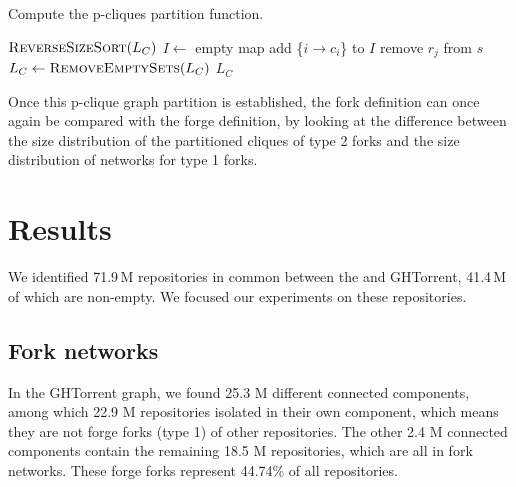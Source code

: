 \begin{algorithm}[t]
    \caption{Compute the p-cliques partition function.}%
    \label{algo:fork-clique-partition}
    \begin{algorithmic}
        \State $\Call{ReverseSizeSort}{L_C}$ 
        \State $I \gets$ empty map 
            \State add \{$i \rightarrow c_i$\} to $I$
        \EndFor
                    \vspace{-\baselineskip}
                        \State remove $r_j$ from $s$
                    \EndIf
                \EndFor
            \EndFor
        \EndFor
        \State $L_C \gets \Call{RemoveEmptySets}{L_C}$ 
        \State \Return $L_C$
    \EndFunction
    \end{algorithmic}
\end{algorithm}

Once this p-clique graph partition is established, the fork definition can once
again be compared with the forge definition, by looking at the difference
between the size distribution of the partitioned cliques of type 2 forks and
the size distribution of networks for type 1 forks.


\section{Results}%
\label{sec:forks-results}

We identified 71.9\,M repositories in common between the \SWHGD{} and GHTorrent,
41.4\,M of which are non-empty. We focused our experiments on these
repositories.

\subsection{Fork networks}%
\label{sec:results-fork-networks}

In the GHTorrent graph, we found 25.3 M different connected components, among
which 22.9 M repositories isolated in their own component, which means they are
not forge forks (type 1) of other repositories.  The other 2.4 M connected
components contain the remaining 18.5 M repositories, which are all in fork
networks.  These forge forks represent 44.74\% of all repositories.

